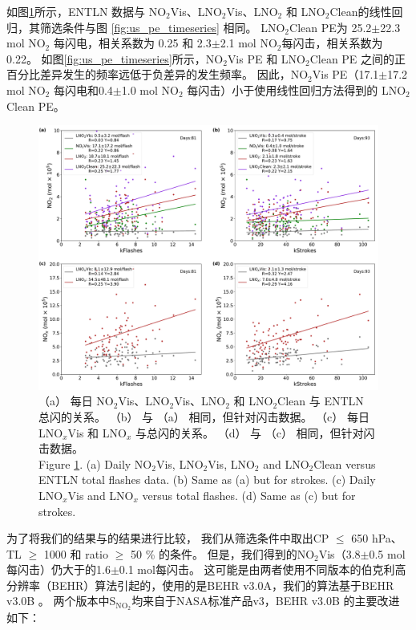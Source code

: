 如图\ref{fig:us_pe_linear}所示，ENTLN 数据与 NO$_2$Vis、LNO$_2$Vis、LNO$_2$ 和 LNO$_2$Clean的线性回归，其筛选条件与图 \ref{fig:us_pe_timeseries} 相同。
LNO$_2$Clean PE为 25.2$\pm$22.3 mol NO$_2$ 每闪电，相关系数为 0.25 和 2.3$\pm$2.1 mol NO$_2$每闪击，相关系数为 0.22。
如图\ref{fig:us_pe_timeseries}所示，NO$_2$Vis PE 和 LNO$_2$Clean PE 之间的正百分比差异发生的频率远低于负差异的发生频率。
因此，NO$_2$Vis PE（17.1$\pm$17.2 mol NO$_2$ 每闪电和0.4$\pm$1.0 mol NO$_2$ 每闪击）小于使用线性回归方法得到的 LNO$_2$Clean PE。

\begin{figure}[t]
    \includegraphics[width=15cm]{./figures/us_pe_linear.pdf}
    \caption{（a） 每日 NO$_2$Vis、LNO$_2$Vis、LNO$_2$ 和 LNO$_2$Clean 与 ENTLN 总闪的关系。
    （b） 与 （a） 相同，但针对闪击数据。
    （c） 每日 LNO$_x$Vis 和 LNO$_x$ 与总闪的关系。
    （d） 与 （c） 相同，但针对闪击数据。\\
    Figure \ref{fig:us_pe_linear}. (a) Daily NO$_2$Vis, LNO$_2$Vis, LNO$_2$ and LNO$_2$Clean versus ENTLN total flashes data.
    (b) Same as (a) but for strokes. (c) Daily LNO$_x$Vis and LNO$_x$ versus total flashes. (d) Same as (c) but for strokes.}
    \label{fig:us_pe_linear}
\end{figure}

为了将我们的结果与\citet{Lapierre.2020}的结果进行比较，
我们从筛选条件中取出CP $\leq$ 650 hPa、TL $\geq$ 1000 和 ratio $\geq$ 50 \% 的条件。
但是，我们得到的NO$_2$Vis（3.8$\pm$0.5 mol每闪击）仍大于\citet{Lapierre.2020}的1.6$\pm$0.1 mol每闪击。
这可能是由两者使用不同版本的伯克利高分辨率（BEHR）算法引起的，\citet{Lapierre.2020}使用的是BEHR v3.0A，我们的算法基于BEHR v3.0B \citep{Laughner.2019a}。
两个版本中S$_{\textrm{NO$_2$}}$均来自于NASA标准产品v3，BEHR v3.0B 的主要改进如下：

